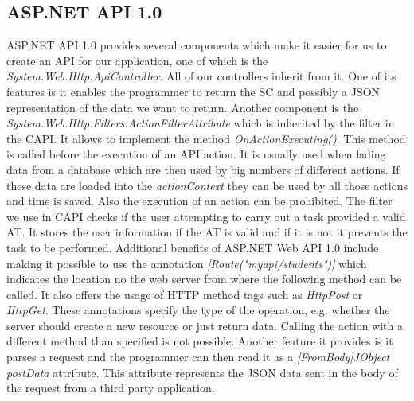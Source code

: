 \subsection{ASP.NET API 1.0}
ASP.NET API 1.0 provides several components which make it easier for us to create an API for our application, one of which is the \textit{System.Web.Http.ApiController}. All of our controllers inherit from it. One of its features is it enables the programmer to return the SC and possibly a JSON representation of the data we want to return. Another component is the \textit{System.Web.Http.Filters.ActionFilterAttribute} which is inherited by the filter in the CAPI. It allows to implement the method \textit{OnActionExecuting()}. This method is called before the execution of an API action. It is usually used when lading data from a database which are then used by big numbers of different actions. If these data are loaded into the \textit{actionContext} they can be used by all those actions and time is saved. Also the execution of an action can be prohibited. The filter we use in CAPI checks if the user attempting to carry out a task provided a valid AT. It stores the user information if the AT is valid and if it is not it prevents the task to be performed. Additional benefits of ASP.NET Web API 1.0 include making it possible to use the annotation \textit{[Route("myapi/students")]} which indicates the location no the web server from where the following method can be called. It also offers the usage of HTTP method tags such as \textit{HttpPost} or \textit{HttpGet}. These annotations specify the type of the operation, e.g. whether the server should create a new resource or just return data. Calling the action with a different method than specified is not possible. Another feature it provides is it parses a request and the programmer can then read it as a \textit{[FromBody]JObject postData} attribute. This attribute represents the JSON data sent in the body of the request from a third party application. 


